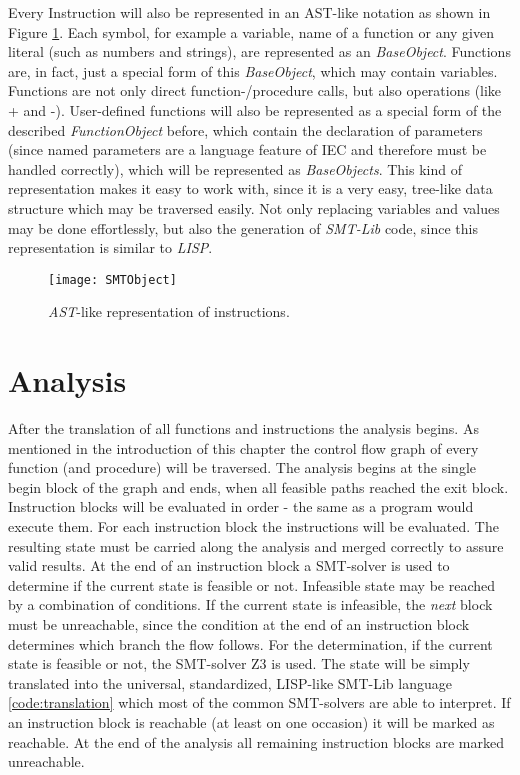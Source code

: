 Every Instruction will also be represented in an AST-like notation as shown in Figure \ref{fig:smtobject}. Each symbol, for example a variable, name of a function or any given literal (such as numbers and strings), are represented as an \emph{BaseObject}. Functions are, in fact, just a special form of this \emph{BaseObject}, which may contain variables. Functions are not only direct function-/procedure calls, but also operations (like + and -). User-defined functions will also be represented as a special form of the described \emph{FunctionObject} before, which contain the declaration of parameters (since named parameters are a language feature of IEC and therefore must be handled correctly), which will be represented as \emph{BaseObjects}. 
This kind of representation makes it easy to work with, since it is a very easy, tree-like data structure which may be traversed easily. Not only replacing variables and values may be done effortlessly, but also the generation of \emph{SMT-Lib} code, since this representation is similar to \emph{LISP}.

\begin{figure}[h!]
	\centering
	\texttt{[image: SMTObject]}
	\caption{\emph{AST}-like representation of instructions. }
	\label{fig:smtobject}
\end{figure}
\section{Analysis}
\label{sec:analysis}
After the translation of all functions and instructions the analysis begins. As mentioned in the introduction of this chapter the control flow graph of every function (and procedure) will be traversed. The analysis begins at the single begin block of the graph and ends, when all feasible paths reached the exit block. Instruction blocks will be evaluated in order - the same as a program would execute them. 
For each instruction block the instructions will be evaluated. The resulting state must be carried along the analysis and merged correctly to assure valid results. At the end of an instruction block a SMT-solver is used to determine if the current state is feasible or not. Infeasible state may be reached by a combination of conditions. If the current state is infeasible, the \emph{next} block must be unreachable, since the condition at the end of an instruction block determines which branch the flow follows. 
For the determination, if the current state is feasible or not, the SMT-solver Z3 \cite{demouraZ3EfficientSMT2008} is used. The state will be simply translated into the universal, standardized, LISP-like SMT-Lib language \ref{code:translation} which most of the common SMT-solvers are able to interpret. 
If an instruction block is reachable (at least on one occasion) it will be marked as reachable. At the end of the analysis all remaining instruction blocks are marked unreachable.

